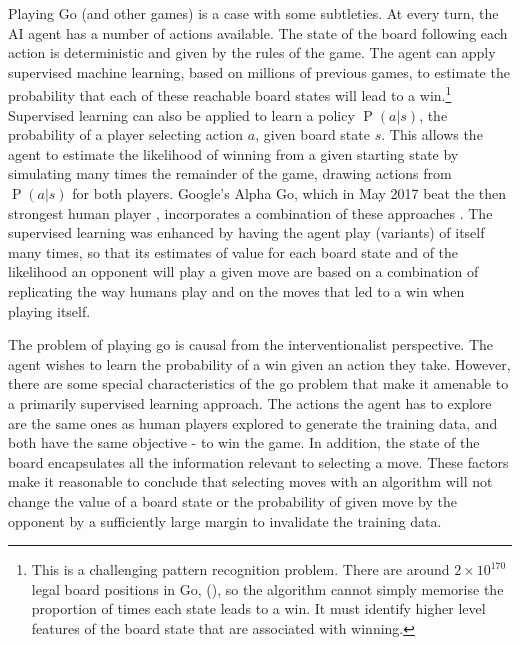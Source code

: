 \documentclass[11pt,a4paper,twoside]{report}
\renewcommand{\P}[1]{\operatorname{P}\left(#1\right)}
\theoremstyle{plain}
\theoremstyle{definition}
\begin{document}
Playing Go (and other games) is a case with some subtleties. At every turn, the AI agent has a number of actions available. The state of the board following each action is deterministic and given by the rules of the game. The agent can apply supervised machine learning, based on millions of previous games, to estimate the probability that each of these reachable board states will lead to a win.\footnote{This is a challenging pattern recognition problem. There are around $2 \times 10^{170}$ legal board positions in Go, (\citep{tromp2016number}), so the algorithm cannot simply memorise the proportion of times each state leads to a win. It must identify higher level features of the board state that are associated with winning.} Supervised learning can also be applied to learn a policy $\P{a|s}$, the probability of a player selecting action $a$, given board state $s$. This allows the agent to estimate the likelihood of winning from a given starting state by simulating many times the remainder of the game, drawing actions from $\P{a|s}$ for both players. Google's Alpha Go, which in May 2017 beat the then strongest human player \citep{Mozur2017}, incorporates a combination of these approaches \citep{silver2016mastering}. The supervised learning was enhanced by having the agent play (variants) of itself many times, so that its estimates of value for each board state and of the likelihood an opponent will play a given move are based on a combination of replicating the way humans play and on the moves that led to a win when playing itself. 

The problem of playing go is causal from the interventionalist perspective. The agent wishes to learn the probability of a win given an action they take. However, there are some special characteristics of the go problem that make it amenable to a primarily supervised learning approach. The actions the agent has to explore are the same ones as human players explored to generate the training data, and both have the same objective - to win the game. In addition, the state of the board encapsulates all the information relevant to selecting a move. These factors make it reasonable to conclude that selecting moves with an algorithm will not change the value of a board state or the probability of given move by the opponent by a sufficiently large margin to invalidate the training data. 
 
\end{document}
